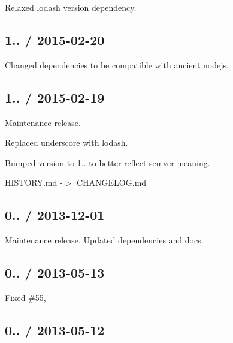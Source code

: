 
\begin{DoxyItemize}
\item Relaxed lodash version dependency.
\end{DoxyItemize}

\subsection*{1.. / 2015-\/02-\/20 }


\begin{DoxyItemize}
\item Changed dependencies to be compatible with ancient nodejs.
\end{DoxyItemize}

\subsection*{1.. / 2015-\/02-\/19 }


\begin{DoxyItemize}
\item Maintenance release.
\item Replaced {\ttfamily underscore} with {\ttfamily lodash}.
\item Bumped version to 1.. to better reflect semver meaning.
\item H\+I\+S\+T\+O\+R\+Y.\+md -\/$>$ C\+H\+A\+N\+G\+E\+L\+O\+G.\+md
\end{DoxyItemize}

\subsection*{0.. / 2013-\/12-\/01 }


\begin{DoxyItemize}
\item Maintenance release. Updated dependencies and docs.
\end{DoxyItemize}

\subsection*{0.. / 2013-\/05-\/13 }


\begin{DoxyItemize}
\item Fixed \#55, 
\end{DoxyItemize}

\subsection*{0.. / 2013-\/05-\/12 }


